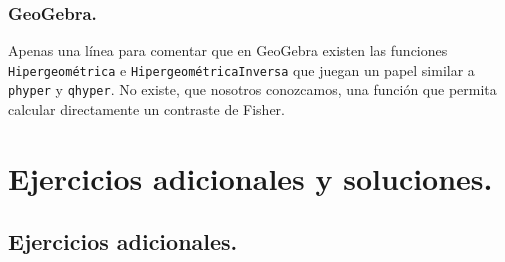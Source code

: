 \documentclass[10pt,a4paper]{article}\usepackage[]{graphicx}\usepackage[]{color}
\newcounter {cont01}
\begin{document}
\subsubsection*{GeoGebra.} Apenas una línea para comentar que en GeoGebra existen las funciones {\tt Hipergeométrica} e {\tt HipergeométricaInversa} que juegan un papel similar a {\tt phyper} y {\tt qhyper}. No existe, que nosotros conozcamos, una función que permita calcular directamente un contraste de Fisher.


\newpage

\section{Ejercicios adicionales y soluciones.}
\label{tut12:sec:EjerciciosAdicionalesYSoluciones}

\subsection*{Ejercicios adicionales.}
\label{tut12:subsec:EjerciciosAdicionales}
\end{document}
